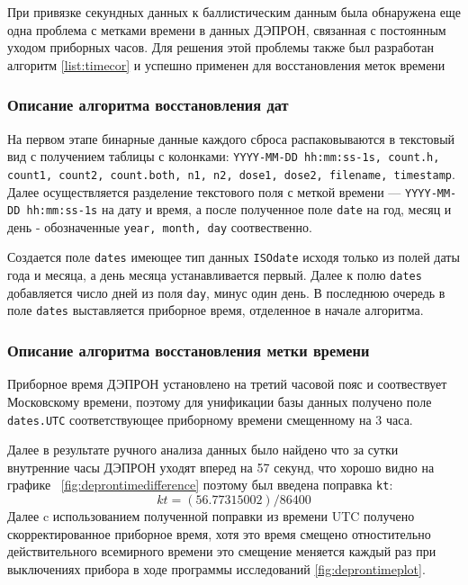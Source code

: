 При привязке секундных данных к баллистическим данным была обнаружена еще одна проблема с метками времени в данных ДЭПРОН, связанная с постоянным уходом приборных часов. Для решения этой проблемы также был разработан алгоритм \ref{list:timecor} и успешно применен для восстановления меток времени

\subsubsection{Описание алгоритма восстановления дат}

На первом этапе  бинарные данные каждого сброса распаковываются в текстовый вид с получением таблицы с колонками: \texttt{YYYY-MM-DD hh:mm:ss-1s,	count.h, count1,	count2,	count.both,	n1,	n2,	dose1, dose2,	filename,	timestamp}. Далее осуществляется разделение текстового поля с меткой времени --- \texttt{YYYY-MM-DD hh:mm:ss-1s} на дату и время, а после полученное поле \texttt{date} на год, месяц и день - обозначенные \texttt{year, month, day} соотвественно.

Создается поле \texttt{dates} имеющее тип данных \texttt{ISOdate} исходя только из полей даты года и месяца, а день месяца устанавливается первый. Далее к полю \texttt{dates} добавляется число дней из поля \texttt{day}, минус один день. В последнюю очередь в поле \texttt{dates} выставляется приборное время, отделенное в начале алгоритма.

\subsubsection{Описание алгоритма восстановления метки времени}

Приборное время ДЭПРОН установлено на третий часовой пояс и соотвествует Московскому времени, поэтому для унификации базы данных получено поле \texttt{dates.UTC} соответствующее приборному времени смещенному на 3 часа.



Далее в результате ручного анализа данных было найдено что за сутки внутренние часы ДЭПРОН уходят вперед на 57 секунд, что хорошо видно на графике~ \ref{fig:deprontimedifference} поэтому был введена поправка \texttt{kt}: \[ kt = (56.77315002) /86400 \] Далее c использованием полученной поправки из времени UTC получено скорректированное приборное время, хотя это время смещено отностительно действительного всемирного времени это смещение меняется каждый раз при выключениях прибора в ходе программы исследований \ref{fig:deprontimeplot}.

